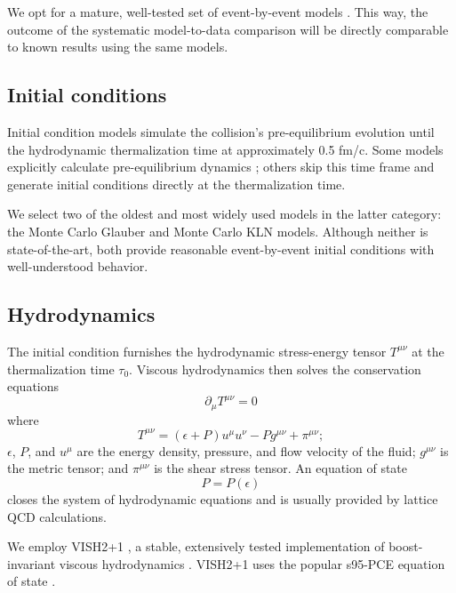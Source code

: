 \documentclass[aps,prc,reprint,superscriptaddress,amsmath]{revtex4-1}
\begin{document}
We opt for a mature, well-tested set of event-by-event models \cite{Shen:2014vra}.
This way, the outcome of the systematic model-to-data comparison will be directly comparable to known results using the same models.

\subsection{Initial conditions}

Initial condition models simulate the collision's pre-equilibrium evolution until the hydrodynamic thermalization time at approximately 0.5 fm/c.
Some models explicitly calculate pre-equilibrium dynamics \cite{}; others skip this time frame and generate initial conditions directly at the thermalization time.

We select two of the oldest and most widely used models in the latter category:
the Monte Carlo Glauber \cite{Miller:2007ri} and Monte Carlo KLN \cite{Drescher:2006pi} models.
Although neither is state-of-the-art, both provide reasonable event-by-event initial conditions with well-understood behavior.

\subsection{Hydrodynamics}

The initial condition furnishes the hydrodynamic stress-energy tensor $T^{\mu\nu}$ at the thermalization time $\tau_0$.
Viscous hydrodynamics then solves the conservation equations
\begin{equation}
  \partial_\mu T^{\mu\nu} = 0
\end{equation}
where
\begin{equation}
  T^{\mu\nu} = (\epsilon + P) u^\mu u^\nu - P g^{\mu\nu} + \pi^{\mu\nu};
\end{equation}
$\epsilon$, $P$, and $u^\mu$ are the energy density, pressure, and flow velocity of the fluid; $g^{\mu\nu}$ is the metric tensor; and $\pi^{\mu\nu}$ is the shear stress tensor.
An equation of state
\begin{equation}
  P = P(\epsilon)
\end{equation}
closes the system of hydrodynamic equations and is usually provided by lattice QCD calculations.

We employ VISH2+1 \cite{Song:2007ux}, a stable, extensively tested implementation of boost-invariant viscous hydrodynamics \cite{Bjorken:1982qr}.
VISH2+1 uses the popular s95-PCE equation of state \cite{Huovinen:2009yb}.
\end{document}
